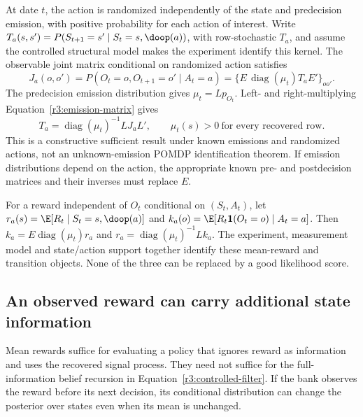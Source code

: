 At date $t$, the action is randomized independently of the state and
predecision emission, with positive probability for each action of
interest. Write $T_a(s,s')=P(S_{t+1}=s'\mid S_t=s,\doop(a))$,
with row-stochastic $T_a$, and assume the controlled structural model
makes the experiment identify this kernel. The observable joint matrix
conditional on randomized action satisfies
\begin{equation}
 J_a(o,o')=P(O_t=o,O_{t+1}=o'\mid A_t=a)
       =\{E\,\operatorname{diag}(\mu_t)T_aE'\}_{oo'}.
 \label{r3:emission-matrix}
\end{equation}
The predecision emission distribution gives $\mu_t=Lp_{O_t}$.
Left- and right-multiplying Equation~\eqref{r3:emission-matrix} gives
\begin{equation}
 T_a=\operatorname{diag}(\mu_t)^{-1}LJ_aL',
 \qquad \mu_t(s)>0\ \text{for every recovered row}.
 \label{r3:controlled-inversion}
\end{equation}
This is a constructive sufficient result under known emissions and
randomized actions, not an unknown-emission POMDP identification theorem.
If emission distributions depend on the action, the appropriate known
pre- and postdecision matrices and their inverses must replace $E$.

For a reward independent of $O_t$ conditional on $(S_t,A_t)$, let
$r_a(s)=\E[R_t\mid S_t=s,\doop(a)]$ and
$k_a(o)=\E[R_t\mathbf1(O_t=o)\mid A_t=a]$. Then
$k_a=E\operatorname{diag}(\mu_t)r_a$ and
$r_a=\operatorname{diag}(\mu_t)^{-1}Lk_a$.
The experiment, measurement model and state/action support together
identify these mean-reward and transition objects. None of the three
can be replaced by a good likelihood score.

\subsection{An observed reward can carry additional state information}
\label{r3:marked-reward-identification}
Mean rewards suffice for evaluating a policy that ignores reward as
information and uses the recovered signal process. They need not suffice
for the full-information belief recursion in
Equation~\eqref{r3:controlled-filter}. If the bank observes the reward
before its next decision, its conditional distribution can change the
posterior over states even when its mean is unchanged.


